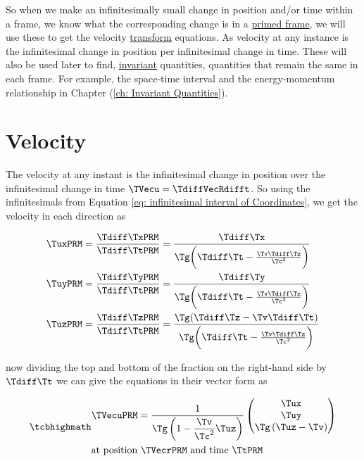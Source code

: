 So when we make an infinitesimally small change in position and/or time within a frame, we know what the corresponding change is in a \hyperlink{def-Primed-Frame}{primed frame}, we will use these to get the velocity \hyperlink{def-transform}{transform} equations.
As velocity at any instance is the infinitesimal change in position per infinitesimal change in time.
These will also be used later to find, \hyperlink{def-lorentz-invariant}{invariant} quantities, quantities that remain the same in each frame.
For example, the space-time interval and the energy-momentum relationship in Chapter (\ref{ch: Invariant Quantities}).

\section{Velocity} \label{sect: Velocity}

The velocity at any instant is the infinitesimal change in position over the infinitesimal change in time $\TVecu = \TdiffVecRdifft$.
So using the infinitesimals from Equation \eqref{eq: infinitesimal interval of Coordinates}, we get the velocity in each direction as

\begin{equation}
	\begin{aligned}
		 & \TuxPRM  = \frac{\Tdiff \TxPRM  }{\Tdiff \TtPRM  } = \frac{\Tdiff \Tx }{ \Tg  \bigg(\Tdiff \Tt -\frac{\Tv \Tdiff \Tz }{ \Tc ^2}\bigg)}                    \\
		 & \TuyPRM  = \frac{\Tdiff \TyPRM  }{\Tdiff \TtPRM  } = \frac{\Tdiff \Ty }{ \Tg  \bigg(\Tdiff \Tt -\frac{\Tv \Tdiff \Tz }{ \Tc ^2}\bigg)}                    \\
		 & \TuzPRM  = \frac{\Tdiff \TzPRM  }{\Tdiff \TtPRM  } = \frac{ \Tg  (\Tdiff \Tz  - {\Tv }\Tdiff \Tt )}{ \Tg  \bigg(\Tdiff \Tt -\frac{\Tv \Tdiff \Tz }{ \Tc ^2}\bigg)}
	\end{aligned}
\end{equation}

now dividing the top and bottom of the fraction on the right-hand side by ${\Tdiff \Tt }$ we can give the equations in their vector form as

\begin{equation}
	\mhl{
		\begin{aligned}
			 & \TVecuPRM  = \dfrac{1}{ {\Tg }\left(1-\dfrac{\Tv }{ \Tc ^2} {\Tuz }\right)}
			\begin{pmatrix}
				\Tux                                \\
				\Tuy                                \\
				{\Tg } \left( \Tuz  - \Tv  \right) \\
			\end{pmatrix}
			\\
			 & \text{at position ${\TVecrPRM  }$ and time $\TtPRM $}
		\end{aligned}
	}
	\label{eq: velocity transform}
\end{equation}

